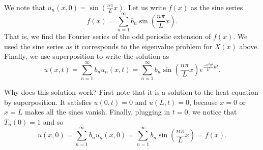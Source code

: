 We note that $u_n(x,0) = \sin \left( \frac{n \pi}{L} x \right)$.  Let us
write $f(x)$ as the sine series
\begin{equation*}
f(x) = \sum_{n=1}^\infty b_n \sin \left(\frac{n \pi}{L}  x \right) .
\end{equation*}
That is, we find the Fourier series of the odd periodic extension of $f(x)$.
We used the sine series as it corresponds to the eigenvalue problem for
$X(x)$ above.
Finally, we use superposition to write the solution as
\begin{equation*}
\boxed{~~
u(x,t) = 
\sum_{n=1}^\infty
b_n
u_n(x,t)
=
\sum_{n=1}^\infty
b_n
\sin \left( \frac{n \pi}{L}  x \right)
e^{\frac{-n^2 \pi^2}{L^2} k t} .
~~}
\end{equation*}

Why does this solution work?  First note that it is a solution to
the heat equation by superposition.  It satisfies $u(0,t) = 0$
and $u(L,t) = 0$, because $x=0$ or $x=L$ makes all the sines vanish.
Finally, plugging in $t=0$, we notice that $T_n(0) = 1$ and so
\begin{equation*}
u(x,0) = 
\sum_{n=1}^\infty
b_n
u_n(x,0)
=
\sum_{n=1}^\infty
b_n
\sin \left( \frac{n \pi}{L} x \right)
=
f(x) .
\end{equation*}

